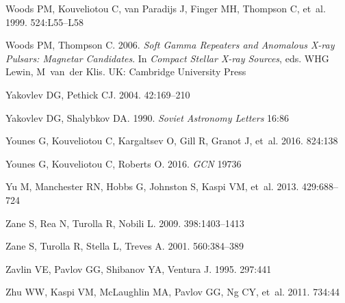 \documentclass[letterpaper]{ar-1col}
\begin{document}
\begin{thebibliography}{}
{Woods} PM, {Kouveliotou} C, {van Paradijs} J, {Finger} MH, {Thompson} C,
  et~al. 1999.
\textit{\apj} 524:L55--L58

Woods PM, Thompson C. 2006.
\textit{{Soft Gamma Repeaters and Anomalous X-ray Pulsars: Magnetar
  Candidates}}. In \textit{Compact Stellar X-ray Sources}, eds. WHG Lewin,
  M~van~der Klis. UK: Cambridge University Press

Yakovlev DG, Pethick CJ. 2004.
\textit{\araa} 42:169--210

{Yakovlev} DG, {Shalybkov} DA. 1990.
\textit{Soviet Astronomy Letters} 16:86

{Younes} G, {Kouveliotou} C, {Kargaltsev} O, {Gill} R, {Granot} J, et~al. 2016.
\textit{\apj} 824:138

Younes G, Kouveliotou C, Roberts O. 2016.
\textit{GCN} 19736

{Yu} M, {Manchester} RN, {Hobbs} G, {Johnston} S, {Kaspi} VM, et~al. 2013.
\textit{\mnras} 429:688--724

{Zane} S, {Rea} N, {Turolla} R, {Nobili} L. 2009.
\textit{\mnras} 398:1403--1413

{Zane} S, {Turolla} R, {Stella} L, {Treves} A. 2001.
\textit{\apj} 560:384--389

Zavlin VE, Pavlov GG, Shibanov YA, Ventura J. 1995.
\textit{\aap} 297:441

{Zhu} WW, {Kaspi} VM, {McLaughlin} MA, {Pavlov} GG, {Ng} CY, et~al. 2011.
\textit{\apj} 734:44

\end{thebibliography}
\end{document}
